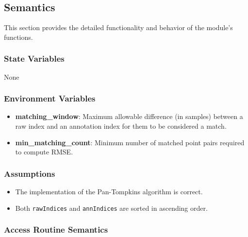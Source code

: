 \documentclass[12pt, titlepage]{article}
\begin{document}
\subsection{Semantics}

This section provides the detailed functionality and behavior of the module’s
functions.

\subsubsection{State Variables}

None

\subsubsection{Environment Variables}

\begin{itemize}
\item \textbf{matching\_window}: Maximum allowable difference (in samples)
between a raw index and an annotation index for them to be considered a match.
\item \textbf{min\_matching\_count}: Minimum number of matched point pairs
required to compute RMSE.
\end{itemize}

\subsubsection{Assumptions}

\begin{itemize}
\item The implementation of the Pan-Tompkins algorithm is correct.
\item Both \texttt{rawIndices} and \texttt{annIndices} are sorted in ascending
order.
\end{itemize}

\subsubsection{Access Routine Semantics}
\end{document}
